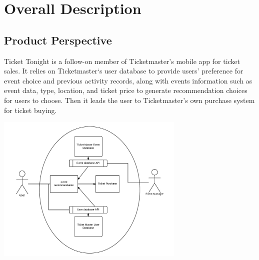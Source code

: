 	\section{Overall Description}
		\subsection{Product Perspective}
		Ticket Tonight is a follow-on member of Ticketmaster’s mobile app for ticket sales. It relies on Ticketmaster‘s user database to provide users’ preference for event choice and previous activity records, along with events information such as event data, type, location, and ticket price to generate recommendation choices for users to choose. Then it leads the user to Ticketmaster’s own purchase system for ticket buying.
		\begin{center}
			\includegraphics[width=90mm]{./pp1.jpg}
		\end{center}
